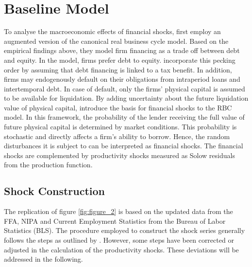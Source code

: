 \section{Baseline Model}
\label{sec:baseline_model}

To analyse the macroeconomic effects of financial shocks, \citeauthor{JERMANNfinancial} first employ an augmented version of the canonical real business cycle model. Based on the empirical findings above, they model firm financing as a trade off between debt and equity. In the model, firms prefer debt to equity. \citeauthor{JERMANNfinancial} incorporate this pecking order by assuming that debt financing is linked to a tax benefit. In addition, firms may endogenously default on their obligations from intraperiod loans and intertemporal debt. In case of default, only the firms' physical capital is assumed to be available for liquidation. 
By adding uncertainty about the future liquidation value of physical capital, \citeauthor{JERMANNfinancial} introduce the basis for financial shocks to the RBC model. In this framework, the probability of the lender receiving the full value of future physical capital is determined by market conditions. This probability is stochastic and directly affects a firm's ability to borrow. Hence, the random disturbances it is subject to can be interpreted as financial shocks. The financial shocks are complemented by productivity shocks measured as Solow residuals from the production function.


\subsection{Shock Construction}
\label{sec:shock_construction}



The replication of figure \ref{fig:figure_2} is based on the updated data from the FFA, NIPA and Current Employment Statistics from the Bureau of Labor Statistics (BLS). The procedure employed to construct the shock series generally follows the steps as outlined by \citeauthor{JERMANNfinancial}. However, some steps have been corrected or adjusted in the calculation of the productivity shocks. These deviations will be addressed in the following. 

